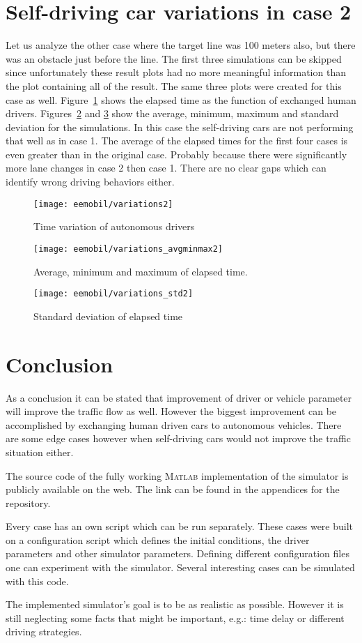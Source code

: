 	\section{Self-driving car variations in case 2}
		Let us analyze the other case where the target line was 100 meters also, but there was an obstacle just before the line. The first three simulations can be skipped since unfortunately these result plots had no more meaningful information than the plot containing all of the result. The same three plots were created for this case as well. Figure~\ref{fig:self_variations2} shows the elapsed time as the function of exchanged human drivers. Figures~\ref{fig:self_variations_avgminmax2} and \ref{fig:self_variations_std2} show the average, minimum, maximum and standard deviation for the simulations. In this case the self-driving cars are not performing that well as in case 1. The average of the elapsed times for the first four cases is even greater than in the original case. Probably because there were significantly more lane changes in case 2 then case 1. There are no clear gaps which can identify wrong driving behaviors either.
		\begin{figure}
			\centering
			\texttt{[image: eemobil/variations2]}
			\caption{Time variation of autonomous drivers}
			\label{fig:self_variations2}
		\end{figure}
		\begin{figure}
			\centering
			\texttt{[image: eemobil/variations\_avgminmax2]}
			\caption{Average, minimum and maximum of elapsed time.}
			\label{fig:self_variations_avgminmax2}
		\end{figure}
		\begin{figure}
			\centering
			\texttt{[image: eemobil/variations\_std2]}
			\caption{Standard deviation of elapsed time}
			\label{fig:self_variations_std2}
		\end{figure}
	\section{Conclusion}
		As a conclusion it can be stated that improvement of driver or vehicle parameter will improve the traffic flow as well. However the biggest improvement can be accomplished by exchanging human driven cars to autonomous vehicles. There are some edge cases however when self-driving cars would not improve the traffic situation either.

		The source code of the fully working \textsc{Matlab} implementation of the simulator is publicly available on the web. The link can be found in the appendices for the repository.

		Every case has an own script which can be run separately. These cases were built on a configuration script which defines the initial conditions, the driver parameters and other simulator parameters. Defining different configuration files one can experiment with the simulator. Several interesting cases can be simulated with this code.

		The implemented simulator's goal is to be as realistic as possible. However it is still neglecting some facts that might be important, e.g.: time delay or different driving strategies.

